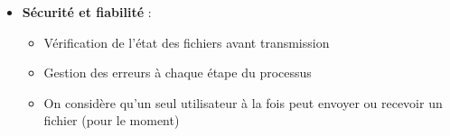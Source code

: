 \documentclass{cs-moi}
\begin{document}
\begin{itemize}
    \item \textbf{Sécurité et fiabilité} : 
    \begin{itemize}
        \item Vérification de l'état des fichiers avant transmission
        \item Gestion des erreurs à chaque étape du processus
        \item On considère qu'un seul utilisateur à la fois peut envoyer ou recevoir un fichier (pour le moment)
    \end{itemize}
\end{itemize}
\end{document}
